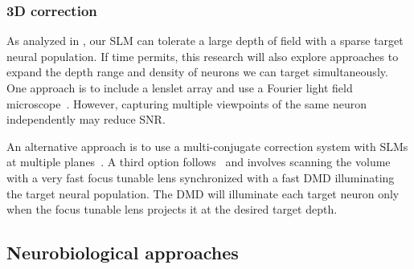 \subsubsection{3D correction}
As analyzed in , our SLM can tolerate a large depth of field with a sparse target neural population. If time permits, this research will also explore approaches to expand the depth range and density of neurons we can target simultaneously. One approach is to include a lenslet array and use a Fourier light field microscope~\cite{Pegard2016Compressive,Guo2019Fourier,Galdon2022Fourier}. However, capturing multiple viewpoints of the same neuron independently may reduce SNR.

An alternative approach is to use a multi-conjugate correction system with SLMs at multiple planes~\cite{Thaung:09,Wu:15,Laslandes:17,Furieri23,Kam2007,Simmonds_2013,Wu:15}. A third option follows~\cite{Xiao2018VideoRate} and involves scanning the volume with a very fast focus tunable lens synchronized with a fast DMD illuminating the target neural population. The DMD will illuminate each target neuron only when the focus tunable lens projects it at the desired target depth.


\subsection{Neurobiological approaches }
